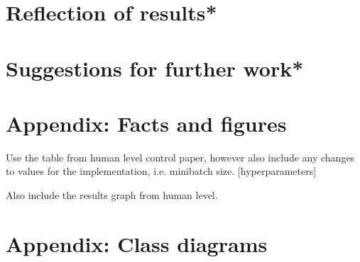 \documentclass[10pt]{article}
\begin{document}
\section{Reflection of results*}

\section{Suggestions for further work*}

\newpage
\printbibliography[
	    heading=bibintoc,
        title={References}
    ]
\newpage
\appendix

\section{Appendix: Facts and figures}
	Use the table from human level control paper, however also include any changes to values for the implementation, i.e. minibatch size. [hyperparameters]
	
	Also include the results graph from human level.

\section{Appendix: Class diagrams}
\end{document}
